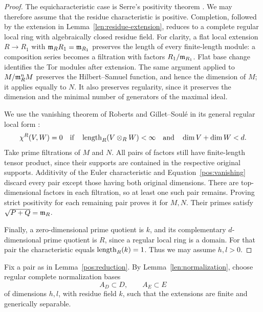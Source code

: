 \begin{proof}
The equicharacteristic case is Serre's positivity theorem
\cite{Serre}.  We may therefore assume that the residue characteristic
is positive.  Completion, followed by the extension in
Lemma~\ref{len:residue-extension}, reduces to a complete regular local
ring with algebraically closed residue field.  For clarity, a flat
local extension $R\to R_1$ with $\mathfrak{m}_RR_1=\mathfrak{m}_{R_1}$ preserves the
length of every finite-length module: a composition series becomes a
filtration with factors $R_1/\mathfrak{m}_{R_1}$.  Flat base change identifies the
Tor modules after extension.  The same argument applied to
$M/\mathfrak{m}_R^nM$ preserves the Hilbert--Samuel function, and hence the
dimension of $M$; it applies equally to $N$.  It also preserves
regularity, since it preserves the dimension and the minimal number
of generators of the maximal ideal.

We use the vanishing theorem of Roberts and Gillet--Soul\'e in its
general regular local form \cite{Roberts,GilletSoule}:
\begin{equation}\label{pos:vanishing}
 \chi^R(V,W)=0
 \quad\text{if}\quad
 \operatorname{length}_R(V\otimes_R W)<\infty
 \quad\text{and}\quad \dim V+\dim W<d.
\end{equation}
Take prime filtrations of $M$ and $N$.  All pairs of factors still
have finite-length tensor product, since their supports are contained
in the respective original supports.  Additivity of the Euler
characteristic and Equation~\eqref{pos:vanishing} discard every pair except
those having both original dimensions.  There are top-dimensional
factors in each filtration, so at least one such pair remains.
Proving strict positivity for each remaining pair proves it for
$M,N$.  Their primes satisfy $\sqrt{P+Q}=\mathfrak{m}_R$.

Finally, a zero-dimensional prime quotient is $k$, and its
complementary $d$-dimensional prime quotient is $R$, since a regular
local ring is a domain.  For that pair the characteristic equals
$\operatorname{length}_R(k)=1$.  Thus we may assume $h,l>0$.
\end{proof}

Fix a pair as in Lemma~\ref{pos:reduction}.  By
Lemma~\ref{len:normalization}, choose regular complete normalization
bases
\[
 A_D\subset D,\qquad A_E\subset E
\]
of dimensions $h,l$, with residue field $k$, such that the extensions
are finite and generically separable.

